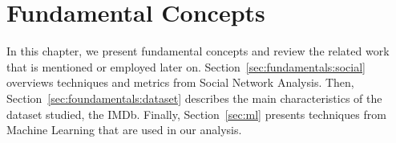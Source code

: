 \chapter{Fundamental Concepts}
\label{chapter:fundamentals}
In this chapter, we present fundamental concepts and review the related work
that is mentioned or employed later on. Section~\ref{sec:fundamentals:social}
overviews techniques and metrics from Social Network Analysis. Then,
Section~\ref{sec:foundamentals:dataset} describes the main characteristics of
the dataset studied, the IMDb. Finally, Section~\ref{sec:ml} presents
techniques from Machine Learning that are used in our analysis.



